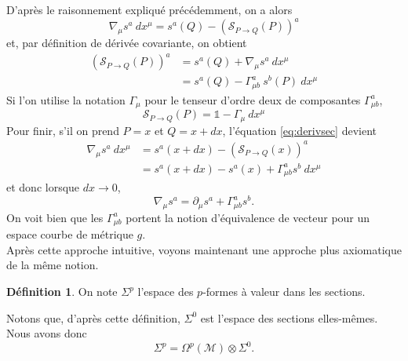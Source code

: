 \documentclass[a4paper,11pt]{report}
\theoremstyle{definition}
\theoremstyle{plain}
\theoremstyle{definition}
\newtheorem{defn}{Définition}[chapter]
\theoremstyle{remark}
\newcommand{\M}{\mathscr{M}}
\renewcommand{\S}{\mathscr{S}}
\newcommand{\p}{\partial}
\begin{document}
                 D'après le raisonnement expliqué précédemment, on a alors
                 \begin{equation}\label{eq:derivsec}
                     \nabla_\mu s^a~dx^\mu = s^a(Q)-\left(\S_{P\to Q}(P)\right)^a
                 \end{equation}
                 et, par définition de dérivée covariante, on obtient
                 \begin{align}
                     \left(\S_{P\to Q}(P)\right)^a &= s^a(Q) + \nabla_\mu s^a~dx^\mu\\
                     &= s^a(Q) - \Gamma^a_{\mu b}~ s^b(P) ~dx^\mu
                 \end{align}
                 Si l'on utilise la notation $\Gamma_\mu$ pour le tenseur d'ordre deux de composantes $\Gamma^a_{\mu b}$, 
                 \begin{equation}
                     \S_{P\to Q}(P) = \mathbb{1} - \Gamma_\mu~dx^\mu
                 \end{equation}
                 Pour finir, s'il on prend $P = x$ et $Q = x+dx$, l'équation \ref{eq:derivsec} devient
                 \begin{align}
                      \nabla_\mu s^a~dx^\mu &= s^a(x+dx)-\left(\S_{P\to Q}(x)\right)^a\\
                      &= s^a(x+dx)-s^a(x)+\Gamma^a_{\mu b}s^b~dx^\mu
                 \end{align}
                 et donc lorsque $dx\to0$,
                 \begin{equation}
                     \nabla_\mu s^a = \p_\mu s^a+\Gamma^a_{\mu b}s^b.
                 \end{equation}
                 On voit bien que les $\Gamma^a_{\mu b}$ portent la notion d'équivalence de vecteur pour un espace courbe de métrique $g$. \\
                 
                 Après cette approche intuitive, voyons maintenant une approche plus axiomatique de la même notion.
                 
                 \begin{defn}
                    On note $\Sigma^p$ l'espace des $p$-formes à valeur dans les sections.
                 \end{defn}
                 
                 Notons que, d'après cette définition, $\Sigma^0$ est l'espace des sections elles-mêmes. Nous avons donc
                 \begin{equation}
                    \Sigma^p = \Omega^p(\M)\otimes\Sigma^0.
                \end{equation}
                
\end{document}
